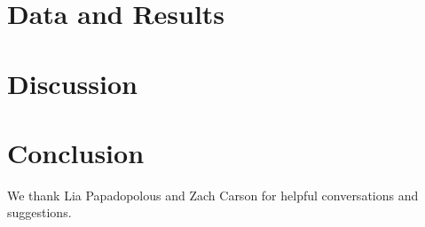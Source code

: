 \documentclass[iop,numberedappendix,appendixfloats]{emulateapj}
\begin{document}
\section{Data and Results}
\label{sec:data}













\section{Discussion}
\label{sec:discuss}
















\section{Conclusion}














\acknowledgments

We thank Lia Papadopolous and Zach Carson for helpful conversations and 
suggestions.






\begin{thebibliography}{}


\end{thebibliography}{}
\end{document}
